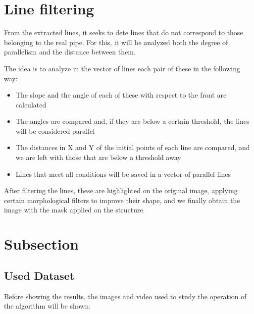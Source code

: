 \documentclass[12pt, a4paper]{article}
\begin{document}
\section{Line filtering}


From the extracted lines, it seeks to dete lines that do not correspond to those belonging to the real pipe. For this, it will be analyzed
both the degree of parallelism and the distance between them.

The idea is to analyze in the vector of lines each pair of these in the following way:


\begin{itemize}

    \item The slope and the angle of each of these with respect to the front are calculated
    \item The angles are compared and, if they are below a certain threshold, the lines will be considered parallel
    \item The distances in X and Y of the initial points of each line are compared, and we are left with those that are below
    a threshold away
    \item Lines that meet all conditions will be saved in a vector of parallel lines
\end{itemize}


After filtering the lines, these are highlighted on the original image, applying certain morphological filters to improve their shape, and we finally obtain the
image with the mask applied on the structure.

\section{Subsection}



\subsection{Used Dataset}

Before showing the results, the images and video used to study the operation of the algorithm will be shown:
\end{document}
